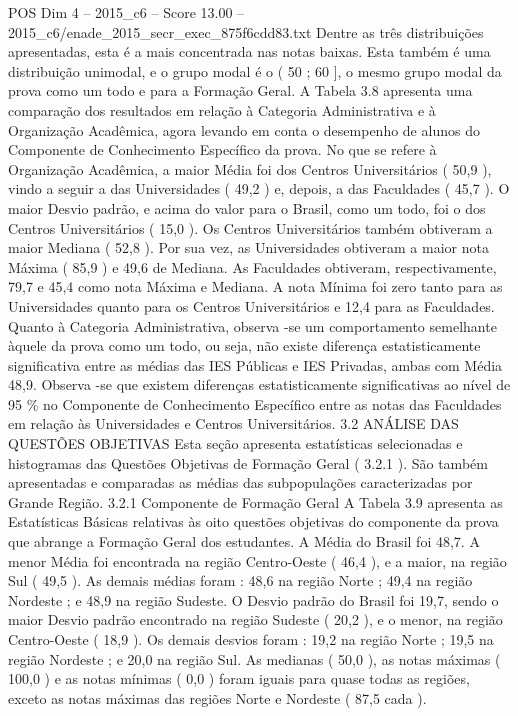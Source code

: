 \begin{textsample}{POS Dim 4 – 2015\_c6 – Score 13.00 – 2015\_c6/enade\_2015\_secr\_exec\_875f6cdd83.txt}
Dentre as três distribuições apresentadas, esta é a mais concentrada nas notas baixas.
Esta também é uma distribuição unimodal, e o grupo modal é o ( 50 ; 60 ], o mesmo grupo modal da prova como um todo e para a Formação Geral.
A Tabela 3.8 apresenta uma comparação dos resultados em relação à Categoria Administrativa e à Organização Acadêmica, agora levando em conta o desempenho de alunos do Componente de Conhecimento Específico da prova.
No que se refere à Organização Acadêmica, a maior Média foi dos Centros Universitários ( 50,9 ), vindo a seguir a das Universidades ( 49,2 ) e, depois, a das Faculdades ( 45,7 ).
O maior Desvio padrão, e acima do valor para o Brasil, como um todo, foi o dos Centros Universitários ( 15,0 ).
Os Centros Universitários também obtiveram a maior Mediana ( 52,8 ).
Por sua vez, as Universidades obtiveram a maior nota Máxima ( 85,9 ) e 49,6 de Mediana.
As Faculdades obtiveram, respectivamente, 79,7 e 45,4 como nota Máxima e Mediana.
A nota Mínima foi zero tanto para as Universidades quanto para os Centros Universitários e 12,4 para as Faculdades.
Quanto à Categoria Administrativa, observa -se um comportamento semelhante àquele da prova como um todo, ou seja, não existe diferença estatisticamente significativa entre as médias das IES Públicas e IES Privadas, ambas com Média 48,9.
Observa -se que existem diferenças estatisticamente significativas ao nível de 95 \% no Componente de Conhecimento Específico entre as notas das Faculdades em relação às Universidades e Centros Universitários. 3.2 ANÁLISE DAS QUESTÕES OBJETIVAS Esta seção apresenta estatísticas selecionadas e histogramas das Questões Objetivas de Formação Geral ( 3.2.1 ).
São também apresentadas e comparadas as médias das subpopulações caracterizadas por Grande Região. 3.2.1 Componente de Formação Geral A Tabela 3.9 apresenta as Estatísticas Básicas relativas às oito questões objetivas do componente da prova que abrange a Formação Geral dos estudantes.
A Média do Brasil foi 48,7.
A menor Média foi encontrada na região Centro-Oeste ( 46,4 ), e a maior, na região Sul ( 49,5 ).
As demais médias foram : 48,6 na região Norte ; 49,4 na região Nordeste ; e 48,9 na região Sudeste.
O Desvio padrão do Brasil foi 19,7, sendo o maior Desvio padrão encontrado na região Sudeste ( 20,2 ), e o menor, na região Centro-Oeste ( 18,9 ).
Os demais desvios foram : 19,2 na região Norte ; 19,5 na região Nordeste ; e 20,0 na região Sul.
As medianas ( 50,0 ), as notas máximas ( 100,0 ) e as notas mínimas ( 0,0 ) foram iguais para quase todas as regiões, exceto as notas máximas das regiões Norte e Nordeste ( 87,5 cada ).

\end{textsample}
